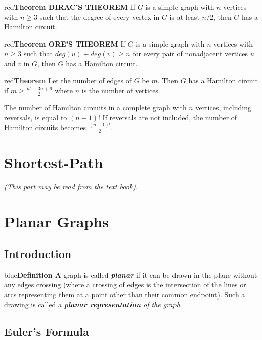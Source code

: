 \documentclass[11pt]{article}
\newenvironment{definition}[1]{\begin{mybox}{blue}{\textbf{Definition #1}}}{\end{mybox}}
\newenvironment{theorem}[1]{\begin{mybox}{red}{\textbf{Theorem #1}}}{\end{mybox}}
\begin{document}
\begin{theorem}{DIRAC’S THEOREM}
If $G$ is a simple graph with $n$ vertices with $n \geq 3$ such that the degree of every vertex in $G$ is at least $n/2$, then $G$ has a Hamilton circuit.
\end{theorem}

\begin{theorem}{ORE’S THEOREM}
If $G$ is a simple graph with $n$ vertices with $n \geq 3$ such that $deg(u) + deg(v) \geq n$ for every pair of nonadjacent vertices $u$ and $v$ in $G$, then $G$ has a Hamilton circuit.
\end{theorem}

\begin{theorem}{}
Let the number of edges of $G$ be $m$. Then $G$ has a Hamilton circuit if $m \geq \frac{n^2-3n+6}{2}$ where $n$ is the number of vertices.
\end{theorem}

The number of Hamilton circuits in a complete graph with $n$ vertices, including reversals, is equal to $(n-1)!$ If reversals are not included, the number of Hamilton circuits becomes $\frac{(n-1)!}{2}$.

\section{Shortest-Path}

\textit{(This part may be read from the text book)}.

\section{Planar Graphs}

\subsection{Introduction}

\begin{definition}{1}
A graph is called \textit{\textbf{planar}} if it can be drawn in the plane without any edges crossing (where a crossing of edges is the intersection of the lines or arcs representing them at a point other than their common endpoint). Such a drawing is called a \textit{\textbf{planar representation} of the graph}.
\end{definition}

\subsection{Euler’s Formula}
\end{document}

